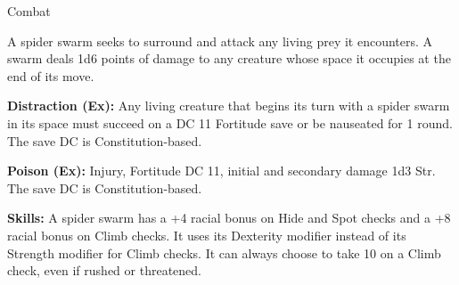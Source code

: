 \documentclass{article}
\begin{document}
Combat

A spider swarm seeks to surround and attack any living prey it encounters. A swarm 
deals 1d6 points of damage to any creature whose space it occupies at the end of 
its move.

\textbf{Distraction (Ex):} Any living creature that begins its turn with a spider 
swarm in its space must succeed on a DC 11 Fortitude save or be nauseated for 1 
round. The save DC is Constitution-based.

\textbf{Poison (Ex): }Injury, Fortitude DC 11, initial and secondary damage 1d3 
Str. The save DC is Constitution-based.

\textbf{Skills:} A spider swarm has a +4 racial bonus on Hide and Spot checks and 
a +8 racial bonus on Climb checks. It uses its Dexterity modifier instead of its 
Strength modifier for Climb checks. It can always choose to take 10 on a Climb 
check, even if rushed or threatened.

\newpage
\end{document}
